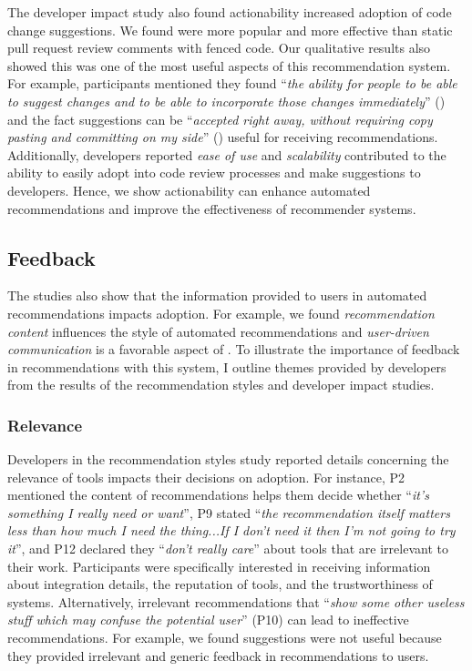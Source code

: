 The developer impact study also found actionability increased adoption of code change suggestions. We found \sugg were more popular and more effective than static pull request review comments with fenced code. Our qualitative results also showed this was one of the most useful aspects of this recommendation system. For example, participants mentioned they found ``\textit{the ability for people to be able to suggest changes and to be able to incorporate those changes immediately}'' () and the fact suggestions can be ``\textit{accepted right away, without requiring copy pasting and committing on my side}'' () useful for receiving recommendations. Additionally, developers reported \textit{ease of use} and \textit{scalability} contributed to the ability to easily adopt \sugg into code review processes and make suggestions to developers. Hence, we show actionability can enhance automated recommendations and improve the effectiveness of recommender systems.

\subsection{Feedback}

The \sugg studies also show that the information provided to users in automated recommendations impacts adoption. For example, we found \textit{recommendation content} influences the style of automated recommendations and \textit{user-driven communication} is a favorable aspect of \suggs. To illustrate the importance of feedback in recommendations with this system, I outline themes provided by developers from the results of the recommendation styles and developer impact studies. 

\subsubsection{Relevance}

Developers in the recommendation styles study reported details concerning the relevance of tools impacts their decisions on adoption. For instance, P2 mentioned the content of recommendations helps them decide whether ``\textit{it's something I really need or want}'', P9 stated ``\textit{the recommendation itself matters less than how much I need the thing...If I don’t need it then I’m not going to try it}'', and P12 declared they ``\textit{don't really care}'' about tools that are irrelevant to their work. Participants were specifically interested in receiving information about integration details, the reputation of tools, and the trustworthiness of systems. Alternatively, irrelevant recommendations that ``\textit{show some other useless stuff which may confuse the potential user}'' (P10) can lead to ineffective recommendations. For example, we found \tele suggestions were not useful because they provided irrelevant and generic feedback in recommendations to users.

